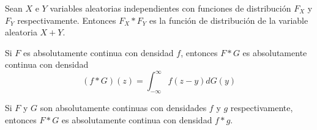 \begin{theorem}
    Sean $X$ e $Y$ variables aleatorias independientes con funciones de distribución $F_X$ y $F_Y$ respectivamente.
    Entonces $F_X \ast F_Y$ es la función de distribución de la variable aleatoria $X+Y$.
\end{theorem}

\begin{theorem}
    Si $F$ es absolutamente continua con densidad $f$, entonces $F \ast G$ es absolutamente continua con densidad
    $$(f \ast G)(z) = \int_{-\infty}^\infty f(z-y)dG(y)$$
\end{theorem}

\begin{theorem}
    Si $F$ y $G$ son absolutamente continuas con densidades $f$ y $g$ respectivamente, entonces $F \ast G$ es absolutamente continua con densidad $f \ast g$.
\end{theorem}

